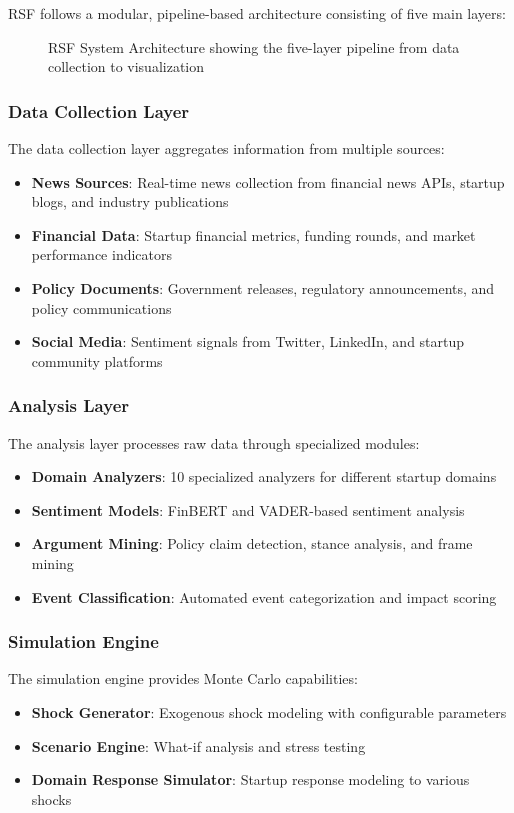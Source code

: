 RSF follows a modular, pipeline-based architecture consisting of five main layers:

\begin{figure}[H]
\centering
{}
\caption{RSF System Architecture showing the five-layer pipeline from data collection to visualization}
\label{fig:system_architecture}
\end{figure}

\subsubsection{Data Collection Layer}
The data collection layer aggregates information from multiple sources:
\begin{itemize}
    \item \textbf{News Sources}: Real-time news collection from financial news APIs, startup blogs, and industry publications
    \item \textbf{Financial Data}: Startup financial metrics, funding rounds, and market performance indicators
    \item \textbf{Policy Documents}: Government releases, regulatory announcements, and policy communications
    \item \textbf{Social Media}: Sentiment signals from Twitter, LinkedIn, and startup community platforms
\end{itemize}

\subsubsection{Analysis Layer}
The analysis layer processes raw data through specialized modules:
\begin{itemize}
    \item \textbf{Domain Analyzers}: 10 specialized analyzers for different startup domains
    \item \textbf{Sentiment Models}: FinBERT and VADER-based sentiment analysis
    \item \textbf{Argument Mining}: Policy claim detection, stance analysis, and frame mining
    \item \textbf{Event Classification}: Automated event categorization and impact scoring
\end{itemize}

\subsubsection{Simulation Engine}
The simulation engine provides Monte Carlo capabilities:
\begin{itemize}
    \item \textbf{Shock Generator}: Exogenous shock modeling with configurable parameters
    \item \textbf{Scenario Engine}: What-if analysis and stress testing
    \item \textbf{Domain Response Simulator}: Startup response modeling to various shocks
\end{itemize}

